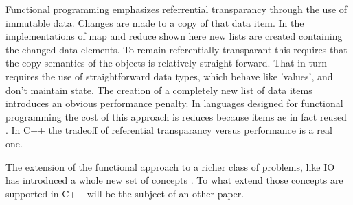 \documentclass[12pt,fleqn]{article}
\begin{document}
Functional programming emphasizes referrential transparancy through the use of immutable data.
Changes are made to a copy of that data item.
In the implementations of map and reduce shown here new lists are created containing the changed data elements.
To remain referentially transparant this requires that the copy semantics of the objects is relatively straight forward.
That in turn requires the use of straightforward data types, which behave like 'values', and don't maintain state.
The creation of a completely new list of data items introduces an obvious performance penalty.
In languages designed for functional programming the cost of this approach is reduces because items ae in fact reused \cite{field}. 
In C++  the tradeoff of referential transparancy versus performance is a real one.

The extension of the functional approach to a richer class of problems, like IO has introduced a whole new set of concepts \cite{bird,lipovaca,yorgey}.
To what extend those concepts are supported in C++ will be the subject of an other paper.
\end{document}
